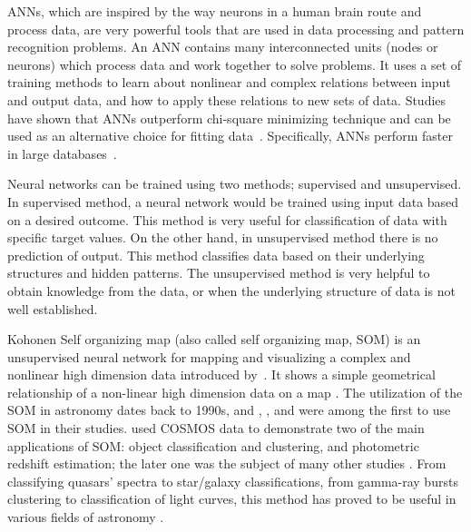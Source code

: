 ANNs, which are inspired by the way neurons in a human brain route and process data, are very powerful tools that are used in data processing and pattern recognition problems.
An ANN contains many interconnected units (nodes or neurons) which process data and work together to solve problems.
It uses a set of training methods to learn about nonlinear and complex relations between input and output data, and how to apply these relations to new sets of data.
Studies have shown that ANNs outperform chi-square minimizing technique and can be used as an alternative choice for fitting data~\citep[e.g.][]{Marquez91,Moayed09}.
Specifically, ANNs perform faster in large databases~\citep[][]{Gulati97}.

Neural networks can be trained using two methods; supervised and unsupervised.
In supervised method, a neural network would be trained using input data based on a desired outcome.
This method is very useful for classification of data with specific target values.%
On the other hand, in unsupervised method there is no prediction of output.
This method classifies data based on their underlying structures and hidden patterns.
The unsupervised method is very helpful to obtain knowledge from the data, or when the underlying structure of data is not well established.%

Kohonen Self organizing map (also called self organizing map, SOM) is an unsupervised neural network for mapping and visualizing a complex and nonlinear high dimension data introduced by~\citep{Kohonen82}.
It shows a simple geometrical relationship of a non-linear high dimension data on a map \citep{Kohonen98}.
The utilization of the SOM in astronomy dates back to 1990s, and \citet[][]{Odewahn92}, \citet[][]{Hernandez94}, and \citet[][]{Murtagh95} were among the first to use SOM in their studies.
\citet{Geach12} used COSMOS data to demonstrate two of the main applications of SOM: object classification and clustering, and photometric redshift estimation; the later one was the subject of many other studies \citep[e.g.][]{Kind14a}.
From classifying quasars' spectra to star/galaxy classifications, from gamma-ray bursts clustering to classification of light curves, this method has proved to be useful in various fields of astronomy \citep[e.g.][]{Maehoenen95, Miller96,Andreon00,Balastegui01,Rajaniemi02,Brett04,Scaringi09}.

